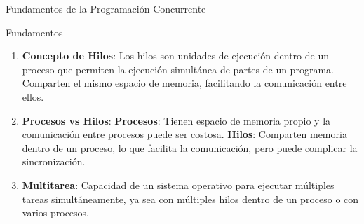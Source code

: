 \documentclass{beamer}
\begin{document}
\begin{frame}{Fundamentos de la Programación Concurrente}
  \begin{block}{Fundamentos}
    \begin{enumerate}
         \item \textbf{Concepto de Hilos}:
            Los hilos son unidades de ejecución dentro de un proceso que permiten la ejecución simultánea de partes de un programa. Comparten el mismo espacio de memoria, facilitando la comunicación entre ellos.
        \item \textbf{Procesos vs Hilos}:
            \textbf{Procesos}: Tienen espacio de memoria propio y la comunicación entre procesos puede ser costosa.
            \textbf{Hilos}: Comparten memoria dentro de un proceso, lo que facilita la comunicación, pero puede complicar la sincronización.
        \item \textbf{Multitarea}:
            Capacidad de un sistema operativo para ejecutar múltiples tareas simultáneamente, ya sea con múltiples hilos dentro de un proceso o con varios procesos.
    \end{enumerate}
  \end{block}
  \end{frame}
\end{document}

